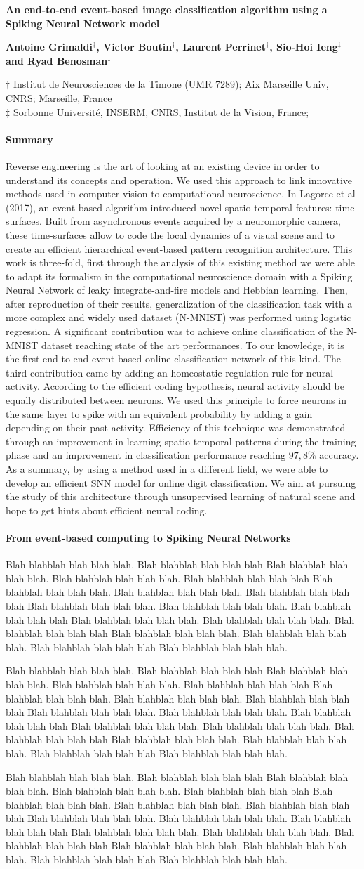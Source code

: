 \documentclass[12pt]{article}
\newcommand{\AuthorAG}{Antoine Grimaldi}
\newcommand{\AuthorLP}{Laurent Perrinet}
\newcommand{\AuthorVB}{Victor Boutin}
\newcommand{\AddressLP}{Institut de Neurosciences de la Timone (UMR 7289); Aix Marseille Univ, CNRS; Marseille, France}%
\newcommand{\AuthorSI}{Sio-Hoi Ieng}
\newcommand{\AuthorRB}{Ryad Benosman}%
\newcommand{\AddressRB}{Sorbonne Université, INSERM, CNRS, Institut de la Vision, France;}%
\newcommand{\Summary}{
Reverse engineering is the art of looking at an existing device in order to understand its concepts and operation. We used this approach to link innovative methods used in computer vision to computational neuroscience. In Lagorce et al (2017), an event-based algorithm introduced novel spatio-temporal features: time-surfaces. Built from asynchronous events acquired by a neuromorphic camera, these time-surfaces allow to code the local dynamics of a visual scene and to create an efficient hierarchical event-based pattern recognition architecture. This work is three-fold, first through the analysis of this existing method we were able to adapt its formalism in the computational neuroscience domain with a Spiking Neural Network of leaky integrate-and-fire models and Hebbian learning. Then, after reproduction of their results, generalization of the classification task with a more complex and widely used dataset (N-MNIST) was performed using logistic regression. A significant contribution was to achieve online classification of the N-MNIST dataset reaching state of the art performances. To our knowledge, it is the first end-to-end event-based online classification network of this kind. The third contribution came by adding an homeostatic regulation rule for neural activity. According to the efficient coding hypothesis, neural activity should be equally distributed between neurons. We used this principle to force neurons in the same layer to spike with an equivalent probability by adding a gain depending on their past activity. Efficiency of this technique was demonstrated through an improvement in learning spatio-temporal patterns during the training phase and an improvement in classification performance reaching $97,8\%$ accuracy. As a summary, by using a method used in a different field, we were able to develop an efficient SNN model for online digit classification. We aim at pursuing the study of this architecture through unsupervised learning of natural scene and hope to get hints about efficient neural coding.
}
\begin{document}
{\Large\bf
An end-to-end event-based image classification algorithm using a Spiking Neural Network model
}

{\bf
\AuthorAG$^{\dagger}$, \AuthorVB$^{\dagger}$, \AuthorLP$^{\dagger}$, \AuthorSI$^{\ddagger}$ and \AuthorRB$^{\ddagger}$
}

{
$\dagger$ \AddressLP \\
$\ddagger$ \AddressRB
}


\parindent 12pt

\paragraph*{Summary}
\Summary

\paragraph*{From event-based computing to Spiking Neural Networks}
Blah blahblah blah blah blah. Blah blahblah blah blah blah Blah blahblah blah blah blah.
Blah blahblah blah blah blah. Blah blahblah blah blah blah Blah blahblah blah blah blah.
Blah blahblah blah blah blah. Blah blahblah blah blah blah Blah blahblah blah blah blah.
Blah blahblah blah blah blah. Blah blahblah blah blah blah Blah blahblah blah blah blah.
Blah blahblah blah blah blah. Blah blahblah blah blah blah Blah blahblah blah blah blah.
Blah blahblah blah blah blah. Blah blahblah blah blah blah Blah blahblah blah blah blah.

Blah blahblah blah blah blah. Blah blahblah blah blah blah Blah blahblah blah blah blah.
Blah blahblah blah blah blah. Blah blahblah blah blah blah Blah blahblah blah blah blah.
Blah blahblah blah blah blah. Blah blahblah blah blah blah Blah blahblah blah blah blah.
Blah blahblah blah blah blah. Blah blahblah blah blah blah Blah blahblah blah blah blah.
Blah blahblah blah blah blah. Blah blahblah blah blah blah Blah blahblah blah blah blah.
Blah blahblah blah blah blah. Blah blahblah blah blah blah Blah blahblah blah blah blah.

Blah blahblah blah blah blah. Blah blahblah blah blah blah Blah blahblah blah blah blah.
Blah blahblah blah blah blah. Blah blahblah blah blah blah Blah blahblah blah blah blah.
Blah blahblah blah blah blah. Blah blahblah blah blah blah Blah blahblah blah blah blah.
Blah blahblah blah blah blah. Blah blahblah blah blah blah Blah blahblah blah blah blah.
Blah blahblah blah blah blah. Blah blahblah blah blah blah Blah blahblah blah blah blah.
Blah blahblah blah blah blah. Blah blahblah blah blah blah Blah blahblah blah blah blah.
\end{document}
